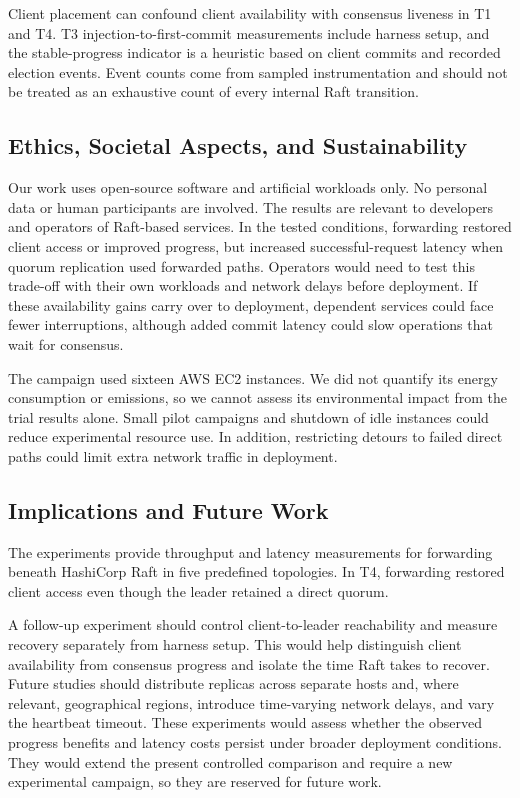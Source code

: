\documentclass[11pt,a4paper]{article}
\begin{document}
Client placement can confound client availability with consensus liveness in T1 and T4. T3 injection-to-first-commit measurements include harness setup, and the stable-progress indicator is a heuristic based on client commits and recorded election events. Event counts come from sampled instrumentation and should not be treated as an exhaustive count of every internal Raft transition.

\subsection{Ethics, Societal Aspects, and Sustainability}

Our work uses open-source software and artificial workloads only.
No personal data or human participants are involved.
The results are relevant to developers and operators of Raft-based services. In the tested conditions, forwarding restored client access or improved progress, but increased successful-request latency when quorum replication used forwarded paths.
Operators would need to test this trade-off with their own workloads and network delays before deployment.
If these availability gains carry over to deployment, dependent services could face fewer interruptions, although added commit latency could slow operations that wait for consensus.

The campaign used sixteen AWS EC2 instances. We did not quantify its energy consumption or emissions, so we cannot assess its environmental impact from the trial results alone.
Small pilot campaigns and shutdown of idle instances could reduce experimental resource use. In addition, restricting detours to failed direct paths could limit extra network traffic in deployment.

\subsection{Implications and Future Work}

The experiments provide throughput and latency measurements for forwarding beneath HashiCorp Raft in five predefined topologies. 
In T4, forwarding restored client access even though the leader retained a direct quorum.

A follow-up experiment should control client-to-leader reachability and measure recovery separately from harness setup. This would help distinguish client availability from consensus progress and isolate the time Raft takes to recover.
Future studies should distribute replicas across separate hosts and, where relevant, geographical regions, introduce time-varying network delays, and vary the heartbeat timeout.
These experiments would assess whether the observed progress benefits and latency costs persist under broader deployment conditions.
They would extend the present controlled comparison and require a new experimental campaign, so they are reserved for future work.
\end{document}
